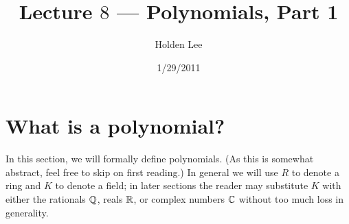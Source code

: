 
\pagestyle{fancy}
\usepackage{hyperref}





%
%

\title{Lecture $8$ --- Polynomials, Part 1}%
\author{Holden Lee}
\date{1/29/2011}%
\maketitle
\thispagestyle{empty}
\section{What is a polynomial?}
In this section, we will formally define polynomials. (As this is somewhat abstract, feel free to skip on first reading.) In general we will use $R$ to denote a ring and $K$ to denote a field; in later sections the reader may substitute %
$K$ with either the rationals $\mathbb{Q}$, reals $\mathbb{R}$, or complex numbers $\mathbb{C}$ without too much loss in generality.

